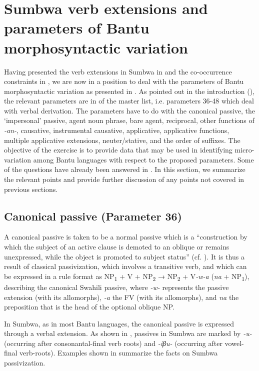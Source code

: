 \documentclass[output=paper		  ]{langscibook}
\begin{document}
\section{Sumbwa verb extensions and parameters of Bantu morphosyntactic variation}\label{sec:kahigi:4}

{Having presented the verb extensions in Sumbwa in  and the co-occurrence constraints in , we are now in a position to deal with the parameters of Bantu morphosyntactic variation as presented in \citet{GuéroisEtAl2017}. As pointed out in the introduction (), the relevant parameters are in  of the master list, i.e. parameters 36-48 which deal with verbal derivation. The parameters have to do with the canonical passive, the ‘impersonal’ passive, agent noun phrase, bare agent, reciprocal, other functions of} {\textit{{}-an-}}{, causative, instrumental causative, applicative, applicative functions, multiple applicative extensions, neuter/stative, and the order of suffixes. The objective of the exercise is to provide data that may be used in identifying micro-variation among Bantu languages with respect to the proposed parameters. Some of the questions have already been answered in . In this section, we summarize the relevant points and provide further discussion of any points not covered in previous sections.}

\subsection{Canonical passive (Parameter 36)}\label{sec:kahigi:4.1}

{A canonical passive is taken to be a normal passive which is a “construction by which the subject of an active clause is demoted to an oblique or remains unexpressed, while the object is promoted to subject status” (cf. \citealt[2]{KulaMarten2010}). It is thus a result of classical passivization, which involves a transitive verb, and which can be expressed in a  rule format as NP}{\textsubscript{1} }{+ V + NP}{\textsubscript{2}} {→ NP}{\textsubscript{2} }{+ V}{\textit{{}-w-a}} ({\textit{na} }{+ NP}{\textsubscript{1}}{), describing the canonical Swahili passive,  where} {\textit{{}-w-}} {represents the passive extension (with its allomorphs),} {\textit{{}-a}} {the FV (with its allomorphs), and} {\textit{na}} {the preposition that is the head of the optional oblique NP.}

{In Sumbwa, as in most Bantu languages, the canonical passive is expressed through a verbal extension. As shown in , passives in Sumbwa are marked by} {\textit{{}-u-}} {(occurring after consonantal-final verb roots) and} {\textit{{}-iβu-}} {(occurring after vowel-final verb-roots). Examples shown in  summarize the facts on Sumbwa passivization.}
\end{document}
